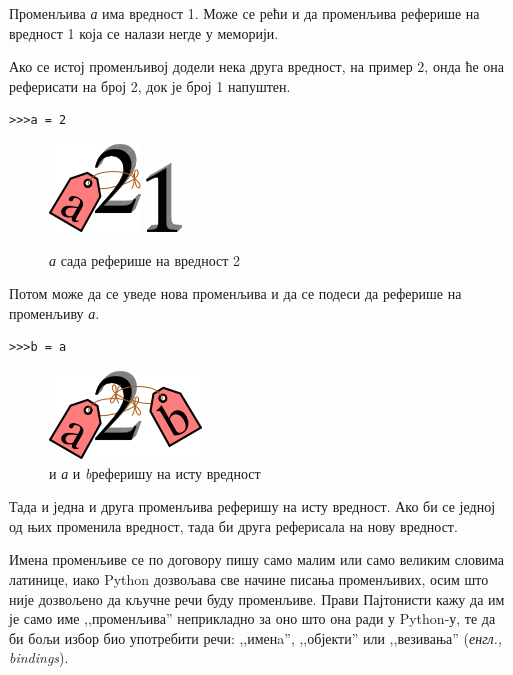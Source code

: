 Променљива \emph{а} има вредност 1. Може се рећи и да променљива реферише на вредност 1 која се налази негде у меморији.

Ако се истој променљивој додели нека друга вредност, на пример 2, онда ће она реферисати на број 2, док је број 1 напуштен.

\begin{lstlisting}
>>>a = 2
\end{lstlisting}

\begin{figure}[here]
\centering
\includegraphics{2a.png}
\includegraphics{1.png}
\caption{\emph{а} сада реферише на вредност 2}
\label{slike:a_je_2}
\end{figure}

Потом може да се уведе нова променљива и да се подеси да реферише на променљиву \emph{а}.

\begin{lstlisting}
>>>b = a
\end{lstlisting}

\begin{figure} [here]
\centering
\includegraphics{2ab.png}
\caption{и \emph{а} и \emph{b}реферишу на исту вредност}
\label{slike:a_b_je_2}
\end{figure}

Тада и једна и друга променљива реферишу на исту вредност. Ако би се једној од њих променила вредност, тада би друга реферисала на нову вредност.

Имена променљиве се по договору пишу само малим или само великим словима латинице, иако Python дозвољава све начине писања променљивих, осим што није дозвољено да кључне речи буду променљиве. Прави Пајтонисти \cite{pythonista} кажу да им је само име ,,променљива'' неприкладно за оно што она ради у Python-у, те да би бољи избор био употребити речи: ,,именa'',  ,,објекти'' или ,,везивања'' (\emph{енгл., bindings}).

